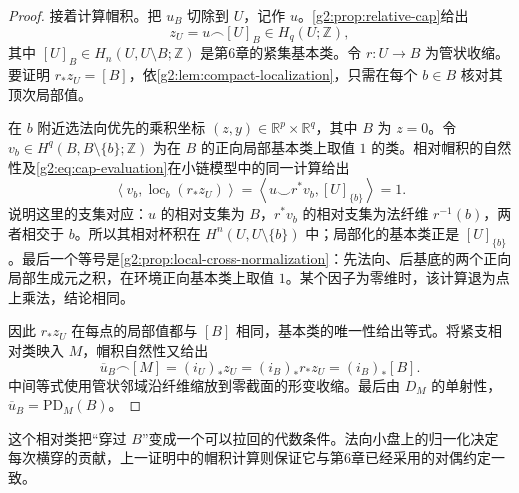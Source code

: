 \begin{proof}
	接着计算帽积。把 \(u_B\) 切除到 \(U\)，记作 \(u\)。\cref{g2:prop:relative-cap}给出
	\[
		z_U=u\frown[U]_B\in H_q(U;\mathbb Z),
	\]
	其中 \([U]_B\in H_n(U,U\setminus B;\mathbb Z)\) 是第6章的紧集基本类。令 \(r:U\to B\) 为管状收缩。要证明 \(r_*z_U=[B]\)，依\cref{g2:lem:compact-localization}，只需在每个 \(b\in B\) 核对其顶次局部值。

	在 \(b\) 附近选法向优先的乘积坐标 \((z,y)\in\mathbb R^p\times\mathbb R^q\)，其中 \(B\) 为 \(z=0\)。令 \(v_b\in H^q(B,B\setminus\{b\};\mathbb Z)\) 为在 \(B\) 的正向局部基本类上取值 \(1\) 的类。相对帽积的自然性及\eqref{g2:eq:cap-evaluation}在小链模型中的同一计算给出
	\begin{equation}\label{g2:eq:normal-cap-local-test}
		\left\langle v_b,\operatorname{loc}_b(r_*z_U)\right\rangle
		=\left\langle u\smile r^*v_b,[U]_{\{b\}}\right\rangle=1.
	\end{equation}
	说明这里的支集对应：\(u\) 的相对支集为 \(B\)，\(r^*v_b\) 的相对支集为法纤维 \(r^{-1}(b)\)，两者相交于 \(b\)。所以其相对杯积在 \(H^n(U,U\setminus\{b\})\) 中；局部化的基本类正是 \([U]_{\{b\}}\)。最后一个等号是\cref{g2:prop:local-cross-normalization}：先法向、后基底的两个正向局部生成元之积，在环境正向基本类上取值 \(1\)。某个因子为零维时，该计算退为点上乘法，结论相同。

	因此 \(r_*z_U\) 在每点的局部值都与 \([B]\) 相同，基本类的唯一性给出等式。将紧支相对类映入 \(M\)，帽积自然性又给出
	\[
		\overline u_B\frown[M]=(i_U)_*z_U
		=(i_B)_*r_*z_U=(i_B)_*[B].
	\]
	中间等式使用管状邻域沿纤维缩放到零截面的形变收缩。最后由 \(D_M\) 的单射性，\(\overline u_B=\mathrm{PD}_M(B)\)。
\end{proof}

这个相对类把“穿过 \(B\)”变成一个可以拉回的代数条件。法向小盘上的归一化决定每次横穿的贡献，上一证明中的帽积计算则保证它与第6章已经采用的对偶约定一致。

